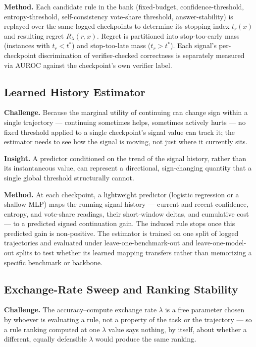 \documentclass[11pt]{article}
\begin{document}
\textbf{Method.} Each candidate rule in the bank (fixed-budget, confidence-threshold, entropy-threshold, self-consistency vote-share threshold, answer-stability) is replayed over the same logged checkpoints to determine its stopping index $t_r(x)$ and resulting regret $R_\lambda(r, x)$. Regret is partitioned into stop-too-early mass (instances with $t_r < t^*$) and stop-too-late mass ($t_r > t^*$). Each signal's per-checkpoint discrimination of verifier-checked correctness is separately measured via AUROC against the checkpoint's own verifier label.

\subsection{Learned History Estimator}
\textbf{Challenge.} Because the marginal utility of continuing can change sign within a single trajectory --- continuing sometimes helps, sometimes actively hurts --- no fixed threshold applied to a single checkpoint's signal value can track it; the estimator needs to see how the signal is moving, not just where it currently sits.

\textbf{Insight.} A predictor conditioned on the trend of the signal history, rather than its instantaneous value, can represent a directional, sign-changing quantity that a single global threshold structurally cannot.

\textbf{Method.} At each checkpoint, a lightweight predictor (logistic regression or a shallow MLP) maps the running signal history --- current and recent confidence, entropy, and vote-share readings, their short-window deltas, and cumulative cost --- to a predicted signed continuation gain. The induced rule stops once this predicted gain is non-positive. The estimator is trained on one split of logged trajectories and evaluated under leave-one-benchmark-out and leave-one-model-out splits to test whether its learned mapping transfers rather than memorizing a specific benchmark or backbone.

\subsection{Exchange-Rate Sweep and Ranking Stability}
\textbf{Challenge.} The accuracy--compute exchange rate $\lambda$ is a free parameter chosen by whoever is evaluating a rule, not a property of the task or the trajectory --- so a rule ranking computed at one $\lambda$ value says nothing, by itself, about whether a different, equally defensible $\lambda$ would produce the same ranking.
\end{document}
